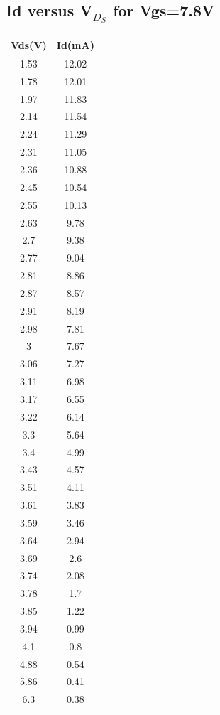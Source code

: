 \subsection{Id versus V$_D_S$ for Vgs=7.8V}
\begin{center}
 \begin{tabular}{|| c | c||} 
 \hline
 Vds(V) & Id(mA) \\ [0.5ex] 
 \hline\hline
 1.53 & 12.02 \\
\hline
1.78 & 12.01 \\
\hline
1.97 & 11.83 \\
\hline
2.14 & 11.54 \\
\hline
2.24 & 11.29 \\
\hline
2.31 & 11.05 \\
\hline
2.36 & 10.88 \\
\hline
2.45 & 10.54 \\
\hline
2.55 & 10.13 \\
\hline
2.63 & 9.78 \\
\hline
2.7 & 9.38 \\
\hline
2.77 & 9.04 \\
\hline
2.81 & 8.86 \\
\hline
2.87 & 8.57 \\
\hline
2.91 & 8.19 \\
\hline
2.98 & 7.81 \\
\hline
3 & 7.67 \\
\hline
3.06 & 7.27 \\
\hline
3.11 & 6.98 \\
\hline
3.17 & 6.55 \\
\hline
3.22 & 6.14 \\
\hline
3.3 & 5.64 \\
\hline
3.4 & 4.99 \\
\hline
3.43 & 4.57 \\
\hline
3.51 & 4.11 \\
\hline
3.61 & 3.83 \\
\hline
3.59 & 3.46 \\
\hline
3.64 & 2.94 \\
\hline
3.69 & 2.6 \\
\hline
3.74 & 2.08 \\
\hline
3.78 & 1.7 \\
\hline
3.85 & 1.22 \\
\hline
3.94 & 0.99 \\
\hline
4.1 & 0.8 \\
\hline
4.88 & 0.54 \\
\hline
5.86 & 0.41 \\
\hline
6.3 & 0.38 \\
\hline


\end{tabular}
\end{center}

